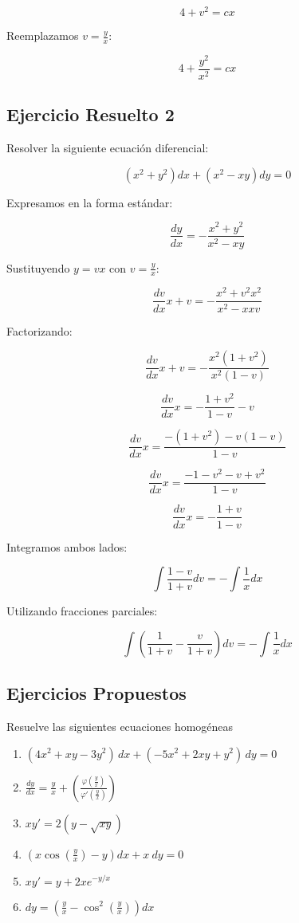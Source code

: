 \[
4+v^{2} = cx
\]

Reemplazamos \( v = \frac{y}{x} \):

\[
4+\frac{y^{2}}{x^{2}} = cx
\]


\subsection{Ejercicio Resuelto 2}

Resolver la siguiente ecuación diferencial:

\[
(x^{2} +y^{2}) dx + (x^{2} -xy) dy = 0
\]

Expresamos en la forma estándar:

\[
\frac{dy}{dx} = -\frac{x^{2} +y^{2}}{x^{2} -xy}
\]

Sustituyendo \( y = vx \) con \( v = \frac{y}{x} \):

\[
\frac{dv}{dx} x + v = -\frac{x^{2} + v^{2} x^{2}}{x^{2} - x x v}
\]

Factorizando:

\[
\frac{dv}{dx} x + v = -\frac{x^{2} (1 + v^{2})}{x^{2} (1 - v)}
\]

\[
\frac{dv}{dx} x = -\frac{1 + v^{2}}{1 - v} - v
\]

\[
\frac{dv}{dx} x = \frac{- (1 + v^{2}) - v (1 - v)}{1 - v}
\]

\[
\frac{dv}{dx} x = \frac{-1 - v^{2} - v + v^{2}}{1 - v}
\]

\[
\frac{dv}{dx} x = -\frac{1 + v}{1 - v}
\]

Integramos ambos lados:

\[
\int \frac{1 - v}{1 + v} dv = -\int \frac{1}{x} dx
\]

Utilizando fracciones parciales:

\[
\int \left( \frac{1}{1+v} - \frac{v}{1+v} \right) dv = -\int \frac{1}{x} dx
\]




\subsection{Ejercicios Propuestos}
Resuelve las siguientes ecuaciones homogéneas
\begin{enumerate}
    \item $(4x^{2} +xy-3y^{2} )\,dx+(-5x^{2} +2xy+y^{2} )\,dy=0$
    \item $\frac{dy}{dx} =\frac{y}{x} +\left(\frac{\varphi \left(\frac{y}{x}\right)}{\varphi '\left(\frac{y}{x}\right)}\right)$
    \item $xy'=2(y-\sqrt{xy})$
    \item $\left( x\cos\left(\frac{y}{x}\right) -y\right) dx+x\ dy=0$
    \item $xy'=y+2xe^{-y/x}$
    \item $dy =\left(\frac{y}{x} -\cos^{2}\left(\frac{y}{x}\right)\right) dx$
\end{enumerate}

